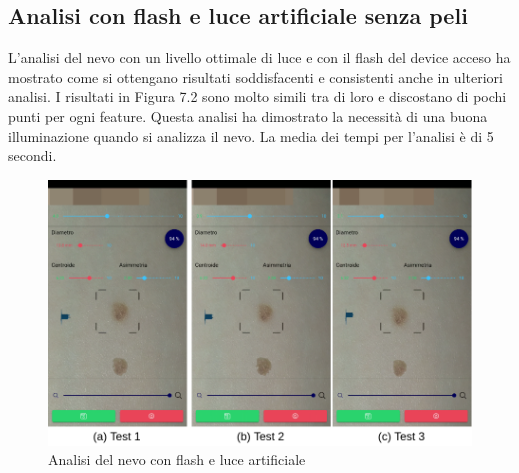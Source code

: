 {\subsection{Analisi con flash e luce artificiale senza peli} 
L'analisi del nevo con un livello ottimale di luce e con il flash del device acceso ha mostrato come si ottengano risultati soddisfacenti e consistenti anche in ulteriori analisi.
\newline
I risultati in Figura 7.2 sono molto simili tra di loro e discostano di pochi punti per ogni feature.
Questa analisi ha dimostrato la necessità di una buona illuminazione quando si analizza il nevo.
La media dei tempi per l'analisi è di 5 secondi. 
\begin{figure}[h]
	\begin{center}
		\includegraphics[scale=0.45]{figure/capitolo7/test2.png}
	\end{center}
	\caption{Analisi del nevo con flash e luce artificiale}	
\end{figure}
\newpage
}
